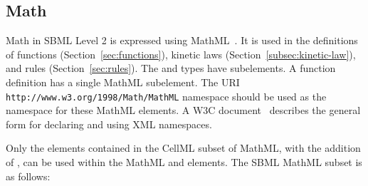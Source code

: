\documentclass[10pt]{cekarticle}
\begin{document}
\subsection{Math}
\label{sec:formulas}

Math in SBML Level 2 is expressed using MathML~\citep{w3c:2000b}.
It is used in the definitions of functions
(Section~\ref{sec:functions}), kinetic laws
(Section~\ref{subsec:kinetic-law}), and rules (Section~\ref{sec:rules}).
The  and  types have
 subelements.  A function definition has a single
MathML  subelement. The URI
\texttt{http://www.w3.org/1998/Math/MathML} namespace should be used as the namespace for these MathML elements.  A W3C
document~\citep{bray:1999} describes the general form for
declaring and using XML namespaces.

Only the elements contained in the CellML subset of MathML, with
the addition of , can be used within the MathML
 and  elements. The SBML MathML subset
is as follows:
\end{document}
